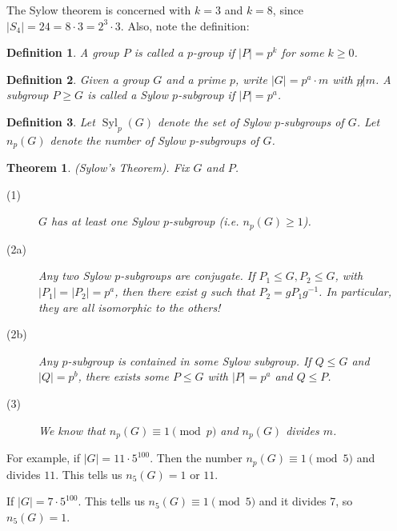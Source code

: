 \documentclass[12pt]{article}
\newtheorem*{theorem}{Theorem}
\newtheorem*{definition}{Definition}
\DeclareMathOperator{\Syl}{Syl}
\begin{document}
  The Sylow theorem is concerned with $k=3$ and $k=8$, since $|S_4| = 24 = 8 \cdot 3 = 2^{3} \cdot 3$.  Also, note the definition:

  \begin{definition}
    A group $P$ is called a $p$-group if $|P| = p^k$ for some $k \geq 0$. \\
  \end{definition}

  \begin{definition}
    Given a group $G$ and a prime $p$, write $|G| = p^a \cdot m$ with $p \not | m$.  A subgroup $P \geq G$ is called a Sylow $p$-subgroup if $|P| = p^a$. \\
  \end{definition}

  \begin{definition}
    Let $\Syl_p(G)$ denote the set of Sylow $p$-subgroups of $G$.  Let $n_p(G)$ denote the number of Sylow $p$-subgroups of $G$. \\
  \end{definition}

  \begin{theorem} (Sylow's Theorem).  Fix $G$ and $P$.

    \begin{description}
      \item[(1)] $G$ has at least one Sylow $p$-subgroup (i.e. $n_p(G) \geq 1$).
      \item[(2a)] Any two Sylow $p$-subgroups are conjugate.  If $P_1 \leq G, P_2 \leq G$, with $|P_1| = |P_2| = p^a$, then there exist $g$ such that $P_2 = g P_1 g^{-1}$.  In particular, they are all isomorphic to the others!
      
      \item[(2b)] Any $p$-subgroup is contained in some Sylow subgroup.  If $Q \leq G$ and $|Q| = p^b$, there exists some $P \leq G$ with $|P| = p^a$ and $Q \leq P$.

      \item[(3)] We know that $n_p(G) \equiv 1 \pmod{p}$ and $n_p(G)$ divides $m$.
    \end{description}
  \end{theorem}

  For example, if $|G| = 11 \cdot 5^{100}$.  Then the number $n_p(G) \equiv 1 \pmod{5}$ and divides $11$.  This tells us $n_5(G) = 1$ or $11$.

  If $|G| = 7 \cdot 5^{100}$.  This tells us $n_5(G) \equiv 1 \pmod{5}$ and it divides 7, so $n_5(G) = 1$.
\end{document}
